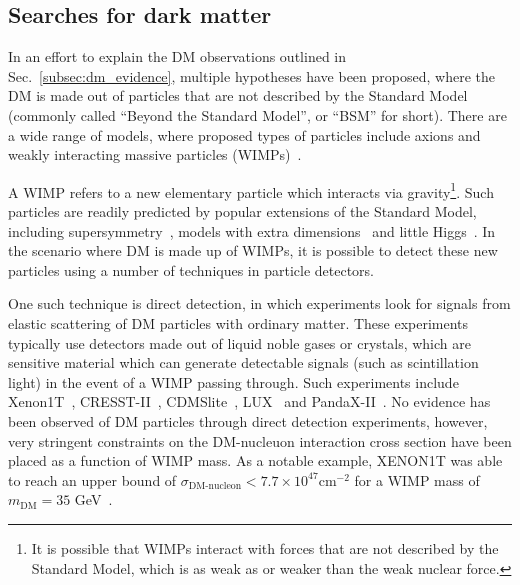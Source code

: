 \subsection{Searches for dark matter}

In an effort to explain the DM observations outlined in Sec.~\ref{subsec:dm_evidence},
multiple hypotheses have been proposed, where the DM is made out of particles that are not
described by the Standard Model (commonly called ``Beyond the Standard Model'', or ``BSM'' for short).
There are a wide range of models, where proposed types of particles include axions and weakly interacting 
massive particles (WIMPs)~\cite{Profumo:2017hqp}.


A WIMP refers to a new elementary particle which interacts via gravity\footnote{It is possible that WIMPs interact
with forces that are not described by the Standard Model, which is as weak as or weaker than the weak nuclear force.}.
Such particles are readily predicted by popular extensions of the Standard Model, including 
supersymmetry~\cite{Jungman:1995df}, models with extra dimensions~\cite{Dienes:1998vh}  
and little Higgs~\cite{Arkani-Hamed:2002ikv}. In the scenario where DM is made up of WIMPs, it is possible to
detect these new particles using a number of techniques in particle detectors. 

One such technique is direct detection, in which experiments look for signals from elastic scattering of DM
particles with ordinary matter. These experiments typically use detectors made out of liquid noble gases or crystals,
which are sensitive material which can generate detectable signals (such as scintillation light) in the event of a WIMP
passing through.
Such experiments include Xenon1T~\cite{XENON:2017vdw}, CRESST-II~\cite{Angloher:2011uu},
CDMSlite~\cite{SuperCDMS:2017nns}, LUX~\cite{LUX:2015abn} and PandaX-II~\cite{PandaX-II:2016vec}.
No evidence has been observed of DM particles through direct detection experiments, however, very stringent constraints
on the DM-nucleuon interaction cross section have been placed as a function of WIMP mass. 
As a notable example, XENON1T was able
to reach an upper bound of $\sigma_{\textrm{DM-nucleon}} < 7.7 \times 10^{47} \textrm{cm}^{-2}$ for a WIMP mass of 
$m_{\textrm{DM}} = 35$ GeV~\cite{XENON:2017vdw}.

